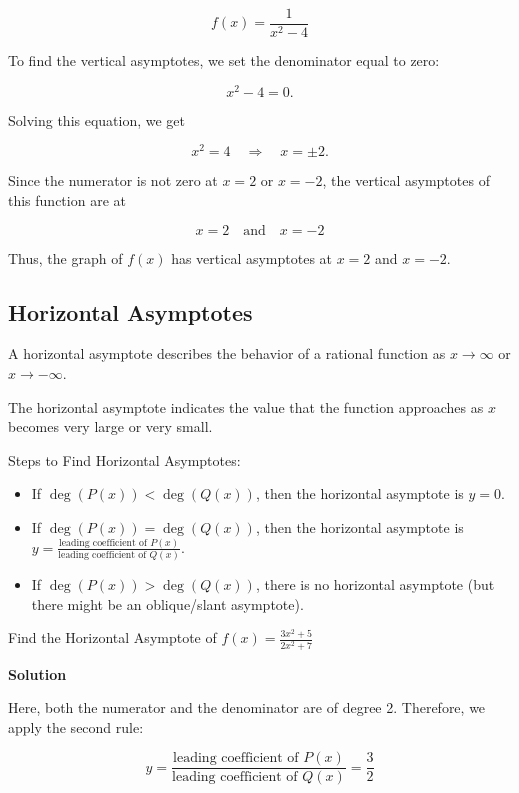 \[
f(x) = \frac{1}{x^2 - 4}
\]

To find the vertical asymptotes, we set the denominator equal to zero:

\[
x^2 - 4 = 0.
\]

Solving this equation, we get

\[
x^2 = 4 \quad \Rightarrow \quad x = \pm 2.
\]

Since the numerator is not zero at \( x = 2 \) or \( x = -2 \), the vertical asymptotes of this function are at

\[
x = 2 \quad \text{and} \quad x = -2
\]

Thus, the graph of \( f(x) \) has vertical asymptotes at \( x = 2 \) and \( x = -2 \).

\subsection*{Horizontal Asymptotes}

A horizontal asymptote describes the behavior of a rational function as \( x \to \infty \) or \( x \to -\infty \).

The horizontal asymptote indicates the value that the function approaches as \( x \) becomes very large or very small.

Steps to Find Horizontal Asymptotes:

\begin{itemize}
    \item If \( \deg(P(x)) < \deg(Q(x)) \), then the horizontal asymptote is \( y = 0 \).
    \item If \( \deg(P(x)) = \deg(Q(x)) \), then the horizontal asymptote is \( y = \frac{\text{leading coefficient of } P(x)}{\text{leading coefficient of } Q(x)} \).
    \item If \( \deg(P(x)) > \deg(Q(x)) \), there is no horizontal asymptote (but there might be an oblique/slant asymptote).
\end{itemize}

\begin{example}
Find the Horizontal Asymptote of \( f(x) = \frac{3x^2 + 5}{2x^2 + 7} \)
\end{example}

\textbf{Solution}

Here, both the numerator and the denominator are of degree 2. Therefore, we apply the second rule:

\[
y = \frac{\text{leading coefficient of } P(x)}{\text{leading coefficient of } Q(x)} = \frac{3}{2}
\]

